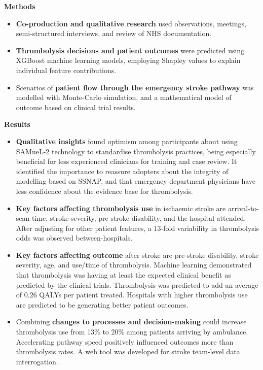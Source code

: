 \textbf{Methods}

\begin{itemize}

    \item \textbf{Co-production and qualitative research} used observations, meetings, semi-structured interviews, and review of NHS documentation.

    \item \textbf{Thrombolysis decisions and patient outcomes} were predicted using XGBoost machine learning models, employing Shapley values to explain individual feature contributions.

    \item Scenarios of \textbf{patient flow through the emergency stroke pathway} was modelled with Monte-Carlo simulation, and a mathematical model of outcome based on clinical trial results.
    
\end{itemize}

\textbf{Results}

\begin{itemize}

    \item \textbf{Qualitative insights} found optimism among participants about using SAMueL-2 technology to standardise thrombolysis practices, being especially beneficial for less experienced clinicians for training and case review. It identified the importance to reassure adopters about the integrity of modelling based on SSNAP, and that emergency department physicians have less confidence about the evidence base for thrombolysis.
    
    \item \textbf{Key factors affecting thrombolysis use} in ischaemic stroke are arrival-to-scan time, stroke severity, pre-stroke disability, and the hospital attended. After adjusting for other patient features, a 13-fold variability in thrombolysis odds was observed between-hospitals.
    
    \item \textbf{Key factors affecting outcome} after stroke are pre-stroke disability, stroke severity, age, and use/time of thrombolysis. Machine learning demonstrated that thrombolysis was having at least the expected clinical benefit as predicted by the clinical trials. Thrombolysis was predicted to add an average of 0.26 QALYs per patient treated. Hospitals with higher thrombolysis use are predicted to be generating better patient outcomes.
    
    \item Combining \textbf{changes to processes and decision-making} could increase thrombolysis use from 13\% to 20\% among patients arriving by ambulance. Accelerating pathway speed positively influenced outcomes more than thrombolysis rates. A web tool was developed for stroke team-level data interrogation.

    \end{itemize}

